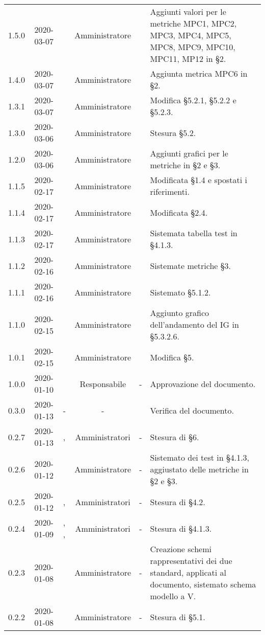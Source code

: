 {\begin{longtable}{ c c  C{2.3cm} c C{3cm} C{3.2cm}}
1.5.0 & 2020-03-07 & \PF{} & Amministratore & \AT{} & Aggiunti valori per le metriche MPC1, MPC2, MPC3, MPC4, MPC5, MPC8, MPC9, MPC10, MPC11, MP12 in §2. \\
1.4.0 & 2020-03-07 & \DF{} & Amministratore & \AT{} & Aggiunta metrica MPC6 in §2. \\
1.3.1 & 2020-03-07 & \CE{} & Amministratore & \SE{} & Modifica §5.2.1, §5.2.2 e §5.2.3. \\
1.3.0 & 2020-03-06 & \PF{} & Amministratore & \AT{} & Stesura §5.2. \\
1.2.0 & 2020-03-06 & \PF{} & Amministratore & \SE{} & Aggiunti grafici per le metriche in §2 e §3. \\
1.1.5 & 2020-02-17 & \CE{} & Amministratore & \AT{} & Modificata §1.4 e spostati i riferimenti. \\
1.1.4 & 2020-02-17 & \PF{} & Amministratore & \AT{} & Modificata §2.4. \\
1.1.3 & 2020-02-17 & \DF{} & Amministratore & \AT{} & Sistemata tabella test in §4.1.3. \\
1.1.2 & 2020-02-16 & \CE{} & Amministratore & \SE{} & Sistemate metriche §3. \\
1.1.1 & 2020-02-16 & \PF{} & Amministratore & \AT{} & Sistemato §5.1.2. \\
1.1.0 & 2020-02-15 & \PF{} & Amministratore & \SE{} & Aggiunto grafico dell'andamento del IG in §5.3.2.6. \\
1.0.1 & 2020-02-15 & \PF{} & Amministratore & \AT{} & Modifica §5. \\
1.0.0 & 2020-01-10 & \SE{} & Responsabile & - & Approvazione del documento. \\
0.3.0 & 2020-01-13 & - & - & \LD{} & Verifica del documento. \\
0.2.7 & 2020-01-13 & \MC{}, \AT{} & Amministratori & - & Stesura di §6. \\
0.2.6 & 2020-01-12 & \AT{} & Amministratore & - & Sistemato dei test in §4.1.3, aggiustato delle metriche in §2 e §3. \\
0.2.5 & 2020-01-12 & \MC{}, \BR{} & Amministratori & - & Stesura di §4.2. \\
0.2.4 & 2020-01-09 & \MC{}, \AT{}, \BR{} & Amministratori & - & Stesura di §4.1.3. \\
0.2.3 & 2020-01-08 & \AT{} & Amministratore & - & Creazione schemi rappresentativi dei due standard, applicati al documento, sistemato schema modello a V. \\
0.2.2 & 2020-01-08 & \MC{} & Amministratore & - & Stesura di §5.1. \\

\end{longtable}}
